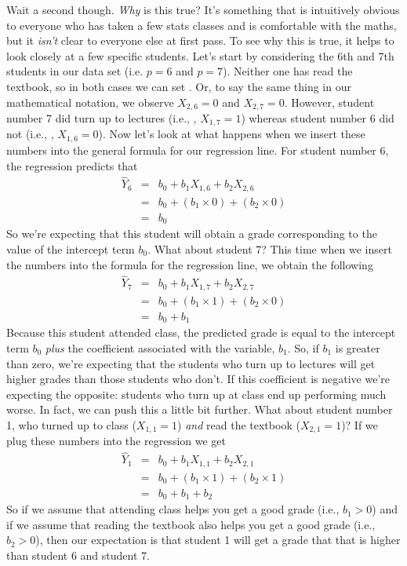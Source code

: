 Wait a second though. {\it Why} is this true? It's something that is intuitively obvious to everyone who has taken a few stats classes and is comfortable with the maths, but it {\it isn't} clear to everyone else at first pass. To see why this is true, it helps to look closely at a few specific students. Let's start by considering the 6th and 7th students in our data set (i.e. $p=6$ and $p=7$). Neither one has read the textbook, so in both cases we can set . Or, to say the same thing in our mathematical notation, we observe $X_{2,6} = 0$ and $X_{2,7} = 0$. However, student number 7 did turn up to lectures (i.e., , $X_{1,7} = 1$) whereas student number 6 did not (i.e., , $X_{1,6} = 0$). Now let's look at what happens when we insert these numbers into the general formula for our regression line. For student number 6, the regression predicts that
\begin{eqnarray*}
\hat{Y}_{6} &=& b_0  + b_1 X_{1,6} + b_2 X_{2,6}\\
&=&  b_0 + (b_1 \times 0)  + ( b_2 \times 0) \\
&=&  b_0
\end{eqnarray*}
So we're expecting that this student will obtain a grade corresponding to the value of the intercept term $b_0$. What about student 7? This time when we insert the numbers into the formula for the regression line, we obtain the following
\begin{eqnarray*}
\hat{Y}_{7} &=& b_0 + b_1 X_{1,7} + b_2 X_{2,7} \\
&=&  b_0 + (b_1 \times 1)  + ( b_2 \times 0) \\
&=&  b_0 + b_1 
\end{eqnarray*}
Because this student attended class, the predicted grade is equal to the intercept term $b_0$ {\it plus} the coefficient associated with the  variable, $b_1$. So, if $b_1$ is greater than zero, we're expecting that the students who turn up to lectures will get higher grades than those students who don't. If this coefficient is negative we're expecting the opposite: students who turn up at class end up performing much worse. In fact, we can push this a little bit further. What about student number 1, who turned up to class ($X_{1,1} = 1$) {\it and} read the textbook ($X_{2,1} = 1$)? If we plug these numbers into the regression we get
\begin{eqnarray*}
\hat{Y}_{1} &=& b_0 + b_1 X_{1,1} + b_2 X_{2,1} \\
&=&  b_0 + (b_1 \times 1)  + ( b_2 \times 1)  \\
&=&  b_0 + b_1 + b_2 
\end{eqnarray*}
So if we assume that attending class helps you get a good grade (i.e., $b_1 > 0$) and if we assume that reading the textbook also helps you get a good grade (i.e., $b_2 >0$), then our expectation is that student 1 will get a grade that that is higher than student 6 and student 7. 

